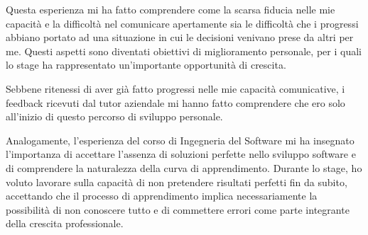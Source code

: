         Questa esperienza mi ha fatto comprendere come la scarsa fiducia nelle mie capacità e la difficoltà nel comunicare apertamente sia le difficoltà che i progressi abbiano portato ad una situazione in cui le decisioni venivano prese da altri per me. Questi aspetti sono diventati obiettivi di miglioramento personale, per i quali lo stage ha rappresentato un'importante opportunità di crescita.

        Sebbene ritenessi di aver già fatto progressi nelle mie capacità comunicative, i feedback ricevuti dal tutor aziendale mi hanno fatto comprendere che ero solo all'inizio di questo percorso di sviluppo personale.

        Analogamente, l'esperienza del corso di Ingegneria del Software mi ha insegnato l'importanza di accettare l'assenza di soluzioni perfette nello sviluppo software e di comprendere la naturalezza della curva di apprendimento. Durante lo stage, ho voluto lavorare sulla capacità di non pretendere risultati perfetti fin da subito, accettando che il processo di apprendimento implica necessariamente la possibilità di non conoscere tutto e di commettere errori come parte integrante della crescita professionale.

